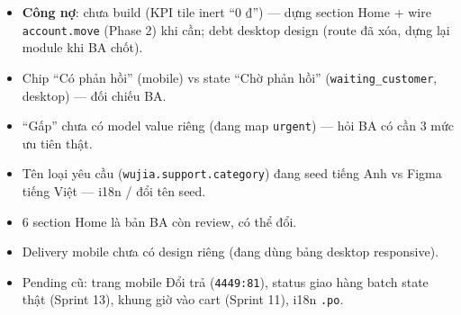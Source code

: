 \begin{itemize}
  \item \textbf{Công nợ}: chưa build (KPI tile inert ``0 ₫'') --- dựng section Home +
        wire \texttt{account.move} (Phase 2) khi cần; debt desktop design (route đã xóa,
        dựng lại module khi BA chốt).
  \item Chip ``Có phản hồi'' (mobile) vs state ``Chờ phản hồi'' (\texttt{waiting\_customer},
        desktop) --- đối chiếu BA.
  \item ``Gấp'' chưa có model value riêng (đang map \texttt{urgent}) --- hỏi BA có cần 3
        mức ưu tiên thật.
  \item Tên loại yêu cầu (\texttt{wujia.support.category}) đang seed tiếng Anh vs Figma
        tiếng Việt --- i18n / đổi tên seed.
  \item 6 section Home là bản BA còn review, có thể đổi.
  \item Delivery mobile chưa có design riêng (đang dùng bảng desktop responsive).
  \item Pending cũ: trang mobile Đổi trả (\texttt{4449:81}), status giao hàng batch state
        thật (Sprint 13), khung giờ vào cart (Sprint 11), i18n \texttt{.po}.
\end{itemize}
